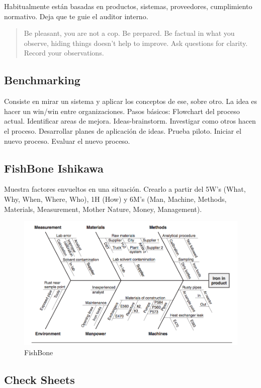 \documentclass[]{article}
\begin{document}
Habitualmente están basadas en productos, sistemas, proveedores, cumplimiento normativo. Deja que te guie el auditor interno.

\begin{quote}
Be pleasant, you are not a cop. Be prepared. Be factual in what you observe, hiding things doesn't help to improve. Ask questions for clarity. Record your observations. 
\end{quote}

\subsection{Benchmarking}

Consiste en mirar un sistema y aplicar los conceptos de ese, sobre otro. La idea es hacer un win/win entre organizaciones. Pasos básicos: Flowchart del proceso actual. Identificar areas de mejora. Ideas-brainstorm. Investigar como otros hacen el proceso. Desarrollar planes de aplicación de ideas. Prueba piloto. Iniciar el nuevo proceso. Evaluar el nuevo proceso.

\subsection{FishBone Ishikawa}

Muestra factores envueltos en una situación. Crearlo a partir del 5W's (What, Why, When, Where, Who), 1H (How) y 6M's (Man, Machine, Methods, Materials, Measurement, Mother Nature, Money, Management).

\begin{figure}[H]
	\centering
	\includegraphics[width=120mm]{imagenes/FishBone.png}
	\caption{FishBone}
	\label{fig:FishBone}
\end{figure}

\subsection{Check Sheets}
\end{document}
